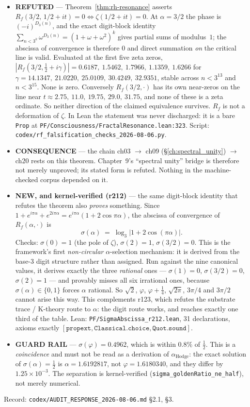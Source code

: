 \begin{itemize}
\item \textbf{REFUTED} --- Theorem~\ref{thm:rh-resonance} asserts
$R_f(3/2,\,1/2+it)=0 \Leftrightarrow \zeta(1/2+it)=0$. At $\alpha=3/2$ the
phase is $(-i)^{D_3(n)}$, and the exact digit-block identity
$\sum_{n<3^k}\omega^{D_3(n)}=(1+\omega+\omega^2)^k$ gives partial sums of
modulus~$1$; the abscissa of convergence is therefore $0$ and direct summation
\emph{on} the critical line is valid. Evaluated at the first five zeta zeros,
$|R_f(3/2,\tfrac12+i\gamma)| = 0.6187,\ 1.5462,\ 1.7966,\ 1.1359,\ 1.6266$
for $\gamma = 14.1347,\ 21.0220,\ 25.0109,\ 30.4249,\ 32.9351$, stable across
$n<3^{13}$ and $n<3^{15}$. None is zero. Conversely $R_f(3/2,\cdot)$ has its
own near-zeros on the line near $t \approx 2.75,\ 11.0,\ 19.75,\ 29.0,\ 31.75$,
and none of these is a zeta ordinate. So neither direction of the claimed
equivalence survives. $R_f$ is not a deformation of $\zeta$.
In Lean the statement was never discharged: it is a bare \texttt{Prop} at
\texttt{PF/Consciousness/FractalResonance.lean:323}.
Script: \texttt{codex/rf\_falsification\_checks\_2026-08-06.py}.
\item \textbf{CONSEQUENCE} --- the chain
ch03 $\to$ ch09 (\S\ref{ch:spectral_unity}) $\to$ ch20 rests on this theorem.
Chapter~9's ``spectral unity'' bridge is therefore not merely unproved; its
stated form is refuted. Nothing in the machine-checked corpus depended on it.
\item \textbf{NEW, and kernel-verified (r212)} --- the same digit-block
identity that refutes the theorem also \emph{proves} something. Since
$1+e^{i\pi\alpha}+e^{2i\pi\alpha}=e^{i\pi\alpha}(1+2\cos\pi\alpha)$, the
abscissa of convergence of $R_f(\alpha,\cdot)$ is
\[
  \sigma(\alpha) \;=\; \log_3\bigl|1+2\cos(\pi\alpha)\bigr|.
\]
Checks: $\sigma(0)=1$ (the pole of $\zeta$), $\sigma(2)=1$, $\sigma(3/2)=0$.
This is the framework's first \emph{non-circular} $\alpha$-selection
mechanism: it is derived from the base-3 digit structure rather than assigned.
Run against the nine canonical values, it derives exactly the three
\emph{rational} ones --- $\sigma(1)=0$, $\sigma(3/2)=0$, $\sigma(2)=1$ --- and
provably misses all six irrational ones, because $\sigma(\alpha)\in\{0,1\}$
forces $\alpha$ rational. So $\sqrt2$, $\varphi$, $\varphi+\tfrac14$,
$\sqrt{2\pi}$, $3\pi/4$ and $3\pi/2$ cannot arise this way. This complements
r123, which refutes the substrate trace / K-theory route to $\alpha$: the
digit route works, and reaches exactly one third of the table.
Lean: \texttt{PF/SigmaAbscissa\_r212.lean}, 31 declarations, axioms exactly
$[\texttt{propext},\texttt{Classical.choice},\texttt{Quot.sound}]$.
\item \textbf{GUARD RAIL} --- $\sigma(\varphi)=0.4962$, which is within $0.8\%$
of $\tfrac12$. This is a \emph{coincidence} and must not be read as a
derivation of $\alpha_{\mathrm{Hodge}}$: the exact solution of
$\sigma(\alpha)=\tfrac12$ is $\alpha=1.6192817$, not $\varphi=1.6180340$, and
they differ by $1.25\times10^{-3}$. The separation is kernel-verified
(\texttt{sigma\_goldenRatio\_ne\_half}), not merely numerical.
\end{itemize}

\noindent Record: \texttt{codex/AUDIT\_RESPONSE\_2026-08-06.md} \S2.1, \S3.

